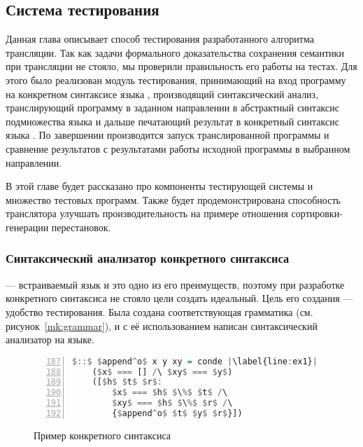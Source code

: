 \subsection{Система тестирования}

Данная глава описывает способ тестирования разработанного алгоритма трансляции.
Так как задачи формального доказательства сохранения семантики при трансляции не стояло, мы проверили правильность его работы на тестах. 
Для этого было реализован модуль тестирования, принимающий на вход программу на конкретном синтаксисе языка \miniKanren{}, производящий синтаксический анализ, транслирующий программу в заданном направлении в абстрактный синтаксис подмножества языка \haskell{} и дальше печатающий результат в конкретный синтаксис языка \haskell{}.
По завершении производится запуск транслированной программы и сравнение результатов с результатами работы исходной программы \miniKanren{} в выбранном направлении. 

В этой главе будет рассказано про компоненты тестирующей системы и множество тестовых программ. 
Также будет продемонстрирована способность транслятора улучшать производительность на примере отношения сортировки-генерации перестановок. 


\subsubsection{Синтаксический анализатор конкретного синтаксиса \miniKanren{}}

\miniKanren{} --- встраиваемый язык и это одно из его преимуществ, поэтому при разработке конкретного синтаксиса не стояло цели создать идеальный.
Цель его создания --- удобство тестирования.
Была создана соответствующая грамматика (см. рисунок~\ref{mk:grammar}), и с её использованием написан синтаксический анализатор на языке.

\begin{figure}[h!]
  \begin{center}
  \begin{minipage}{0.35\textwidth}
  \begin{lstlisting}[language=Haskell, frame=single, numbers=left,numberstyle=\small, firstnumber=187, escapechar=|]
  $::$ $append^o$ x y xy = conde |\label{line:ex1}|
    ($x$ === [] /\ $xy$ === $y$)
    ([$h$ $t$ $r$: 
        $x$ === $h$ $\%$ $t$ /\
        $xy$ === $h$ $\%$ $r$ /\
        {$append^o$ $t$ $y$ $r$}])     
  \end{lstlisting}
  \end{minipage}
  \end{center}
  \caption{Пример конкретного синтаксиса \miniKanren{}}
  \label{lst:ex}
\end{figure}

